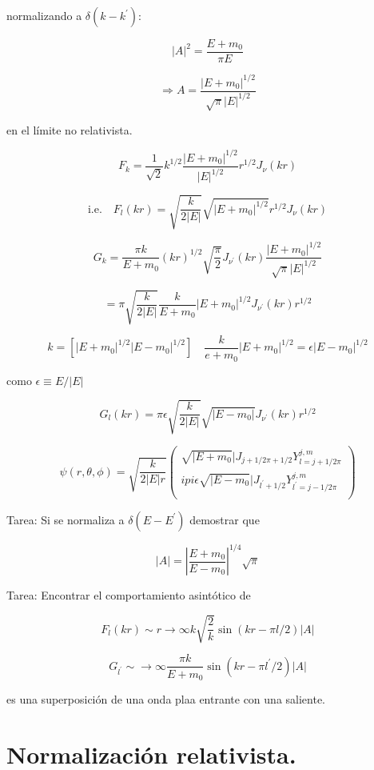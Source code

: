 \documentclass{report}
\begin{document}
normalizando a $\delta (k-k^{\prime}):$

\[|A|^{2} = \frac{E+m_0 }{\pi E}\]

\begin{equation}
\Rightarrow A = \frac{|E+m_0 |^{1/2}}{\sqrt{\pi}|E|^{1/2}}
\end{equation}

en el límite no relativista.

\[F_k = \frac{1}{\sqrt{2}} k^{1/2} \frac{|E+m_0 |^{1/2}}{|E|^{1/2}} r^{1/2} J_{\nu} (kr)\]

\[\text{i.e.} \quad F_{l}(kr) = \sqrt{\frac{k}{2|E|}} \sqrt{|E+m_0 |^{1/2}} r^{1/2}J_{\nu}(kr)\]

\[G_k = \frac{\pi k}{E+m_0 } (kr)^{1/2} \sqrt{\frac{\pi}{2}}J_{\nu^{\prime}}(kr) \frac{|E+m_0 |^{1/2}}{\sqrt{\pi}|E|^{1/2}}\]

\[= \pi \sqrt{\frac{k}{2|E|}}\frac{k}{E+m_0 }|E+m_0 |^{1/2} J_{\nu^{\prime}}(kr) r^{1/2}\]

\[k = [|E+m_0 |^{1/2} |E-m_0 |^{1/2} ] \quad  \frac{k}{e+m_0 } |E+m_0 |^{1/2} = \epsilon |E-m_0 |^{1/2}\]

como $\epsilon \equiv E/|E|$

\[G_l (kr) = \pi \epsilon \sqrt{\frac{k}{2|E|}} \sqrt{|E-m_0|} J_{\nu^{\prime}} (kr) r^{1/2}\]

\[\psi (r,\theta , \phi) = \sqrt{\frac{k}{2|E|r}} \left ( \begin{array}{cc}
 \sqrt{|E+m_0 }| J_{j+1/2 \pi+1/2}Y_{l=j+1/2\pi}^{j,m}   \\
 i pi \epsilon \sqrt{|E-m_0 }| J_{l^{\prime}+1/2}Y_{l^{\prime}=j-1/2\pi}^{j,m}   \\
 \end{array} \right)  \]

Tarea: Si se normaliza a $\delta (E-E^{\prime})$ demostrar que

\[|A| = |\frac{E+m_0 }{E-m_0 }|^{1/4} \sqrt{\pi}\]

Tarea:
Encontrar el comportamiento asintótico de

\[F_{l}(kr) \sim r \rightarrow \infty k \sqrt{\frac{2}{k}} \sin (kr - \pi l/2)|A|\]

\[G_{l^{\prime}} \sim \rightarrow \infty \frac{\pi k}{E+m_0 } \sin (kr - \pi l^{\prime}/2)|A|\]

es una superposición de una onda plaa entrante con una saliente.
\section{Normalización relativista.} 
\end{document}
